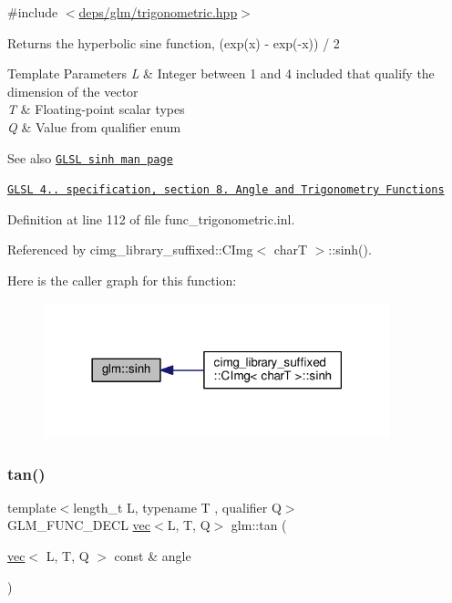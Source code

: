 {\ttfamily \#include $<$\hyperlink{trigonometric_8hpp}{deps/glm/trigonometric.\+hpp}$>$}

Returns the hyperbolic sine function, (exp(x) -\/ exp(-\/x)) / 2


\begin{DoxyTemplParams}{Template Parameters}
{\em L} & Integer between 1 and 4 included that qualify the dimension of the vector \\
\hline
{\em T} & Floating-\/point scalar types \\
\hline
{\em Q} & Value from qualifier enum\\
\hline
\end{DoxyTemplParams}
\begin{DoxySeeAlso}{See also}
\href{http://www.opengl.org/sdk/docs/manglsl/xhtml/sinh.xml}{\tt G\+L\+SL sinh man page} 

\href{http://www.opengl.org/registry/doc/GLSLangSpec.4.20.8.pdf}{\tt G\+L\+SL 4.. specification, section 8. Angle and Trigonometry Functions} 
\end{DoxySeeAlso}


Definition at line 112 of file func\+\_\+trigonometric.\+inl.



Referenced by cimg\+\_\+library\+\_\+suffixed\+::\+C\+Img$<$ char\+T $>$\+::sinh().

Here is the caller graph for this function\+:
\nopagebreak
\begin{figure}[H]
\begin{center}
\leavevmode
\includegraphics[width=285pt]{dc/d43/group__core__func__trigonometric_gac7c39ff21809e281552b4dbe46f4a39d_icgraph}
\end{center}
\end{figure}
\mbox{\label{group__core__func__trigonometric_ga293a34cfb9f0115cc606b4a97c84f11f}} 
\subsubsection{\texorpdfstring{tan()}{tan()}}
{\footnotesize\ttfamily template$<$length\+\_\+t L, typename T , qualifier Q$>$ \\
G\+L\+M\+\_\+\+F\+U\+N\+C\+\_\+\+D\+E\+CL \hyperlink{structglm_1_1vec}{vec}$<$L, T, Q$>$ glm\+::tan (\begin{DoxyParamCaption}\item[{\hyperlink{structglm_1_1vec}{vec}$<$ L, T, Q $>$ const \&}]{angle }\end{DoxyParamCaption})}



